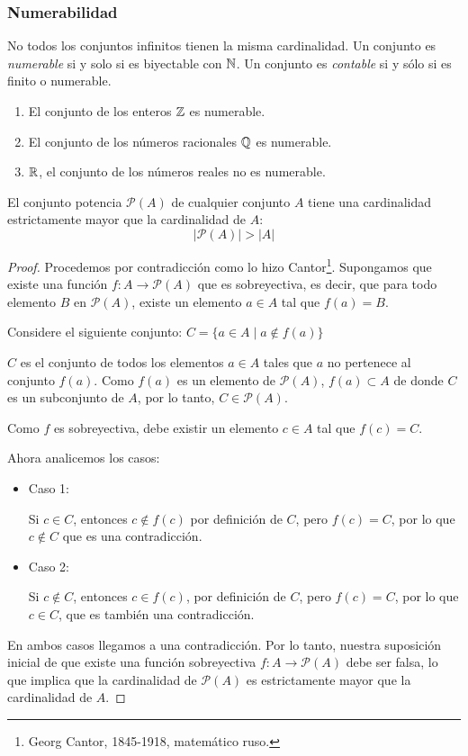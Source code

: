\subsubsection{Numerabilidad}
No todos los conjuntos infinitos tienen la misma cardinalidad. Un conjunto es \textit{numerable} si y solo si es biyectable con $\mathbb{N}$. Un conjunto es \textit{contable} si y sólo si es finito o numerable.

\begin{fmd-example}
	\begin{enumerate}
		\item El conjunto de los enteros $\mathbb{Z}$ es numerable.
		\item El conjunto de los números racionales $\mathbb{Q}$ es numerable.
		\item $\mathbb{R}$, el conjunto de los números reales no es numerable.
	\end{enumerate}
\end{fmd-example}

\begin{fmd-theorem}  
	El conjunto potencia $\mathcal{P}(A)$ de cualquier conjunto $A$ tiene una cardinalidad estrictamente mayor que la cardinalidad de $A$:
	\[ |\mathcal{P}(A)| >  |A| \]
	
	\begin{proof}
		Procedemos por contradicción como lo hizo Cantor\footnote{Georg Cantor, 1845-1918, matemático ruso.}. Supongamos que existe una función $f: A \rightarrow \mathcal{P}(A)$ que es sobreyectiva, es decir, que para todo elemento $B$ en $\mathcal{P}(A)$, existe un elemento $a \in A$ tal que $f(a) = B$.
		
		Considere el siguiente conjunto: $ C = \{ a \in A \mid a \not \in f(a) \} $
		
		$C$ es el conjunto de todos los elementos $a \in A$ tales que $a$ no pertenece al conjunto $f(a)$.
		Como $f(a)$ es un elemento de $\mathcal{P}(A)$, $f(a) \subset A$ de donde $C$ es un subconjunto de $A$, por lo tanto, $C \in \mathcal{P}(A)$.
		
		Como $f$ es sobreyectiva, debe existir un elemento $c \in A$ tal que $f(c) = C$.
		
		Ahora analicemos los casos:
		
		\begin{itemize}
			\item Caso 1:
			
			 Si $c \in C$, entonces $c \not \in f(c)$ por definición de $C$, pero $f(c) = C$, por lo que $c \not \in C$ que es una contradicción.
			\item Caso 2:
			
			Si $c \not \in C$, entonces $c \in f(c)$, por definición de $C$, pero $f(c) = C$, por lo que $c \in C$, que es también una contradicción.
		\end{itemize}
		En ambos casos llegamos a una contradicción. Por lo tanto, nuestra suposición inicial de que existe una función sobreyectiva $f: A \rightarrow \mathcal{P}(A)$ debe ser falsa, lo que implica que la cardinalidad de $\mathcal{P}(A)$ es estrictamente mayor que la cardinalidad de $A$.
	\end{proof}
\end{fmd-theorem}


